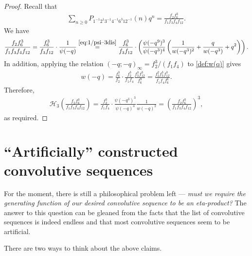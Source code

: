 \documentclass[12pt,reqno]{amsart}
\numberwithin{equation}{section}
\theoremstyle{plain}
\theoremstyle{definition}
\theoremstyle{named}
\newcommand{\HH}{\mathcal{H}}
\begin{document}
\begin{proof}
	Recall that
	\begin{align*}
		\sum_{n\ge 0} P_{1^{-1} 2^1 3^{-1} 4^{-1} 6^3 12^{-1}}(n) q^n = \frac{f_2 f_6^3}{f_1 f_3 f_4 f_{12}}.
	\end{align*}
	We have
	\begin{align*}
		\frac{f_2 f_6^3}{f_1 f_3 f_4 f_{12}} = \frac{f_6^3}{f_3 f_{12}}\cdot \frac{1}{\psi(-q)} \overset{\eqref{eq:1/psi--3dis}}{=} \frac{f_6^3}{f_3 f_{12}}\cdot \left(\frac{\psi(-q^9)^3}{\psi(-q^3)^4}\left(\frac{1}{w(-q^3)^2}+\frac{q}{w(-q^3)}+q^2\right)\right).
	\end{align*}
	In addition, applying the relation $(-q;-q)_{\infty}=f_2^3/(f_1f_4)$ to \eqref{def:w(q)} gives
	\begin{align*}
		w(-q) = \frac{f_6^3}{f_2}\cdot \frac{f_2^3}{f_1f_4}\frac{f_3^3f_{12}^3}{f_6^9} = \frac{f_2^2 f_3^3 f_{12}^3}{f_1 f_4 f_6^6}.
	\end{align*}
	Therefore,
	\begin{align*}
		\HH_3\left(\frac{f_2 f_6^3}{f_1 f_3 f_4 f_{12}}\right) = \frac{f_2^3}{f_1 f_{4}}\cdot \frac{\psi(-q^3)^3}{\psi(-q)^4}\frac{1}{w(-q)^2} = \left(\frac{f_2 f_6^3}{f_1 f_3 f_4 f_{12}}\right)^3,
	\end{align*}
	as required.
\end{proof}



\section{``Artificially'' constructed convolutive sequences }\label{sec:artificial}

For the moment, there is still a philosophical problem left --- \textit{must we require the generating function of our desired convolutive sequence to be an eta-product?} The answer to this question can be gleaned from the facts that the list of convolutive sequences is indeed endless and that most convolutive sequences seem to be artificial. 

There are two ways to think about the above claims.
\end{document}
